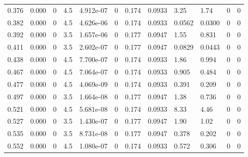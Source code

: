 \documentclass[preview]{standalone}
\begin{document}
{{\begin{tabular}{L{1.2cm}C{1.2cm} C{0.3cm}C{0.5cm} C{1.4cm}C{1.4cm} C{1.4cm}C{1.4cm} C{1.6cm}C{1.6cm} C{1.6cm}C{1.6cm}}
  0.376  &  0.000  & 0     & 4.5 &  4.912e-07  & 0  &  0.174&   0.0933& 3.25 & 1.74   &  0 & 0  \\ 
  0.382  &  0.000  & 0     & 4.5 &  4.626e-06  & 0  &  0.174&   0.0933& 0.0562 & 0.0300   &  0 & 0  \\ 
  0.392  &  0.000  & 0     & 3.5 &  1.657e-06  & 0  &  0.177&   0.0947& 1.55 & 0.831   &  0 & 0  \\ 
  0.411  &  0.000  & 0     & 3.5 &  2.602e-07  & 0  &  0.177&   0.0947& 0.0829 & 0.0443   &  0 & 0  \\ 
  0.438  &  0.000  & 0     & 4.5 &  7.700e-07  & 0  &  0.174&   0.0933& 1.86 & 0.994   &  0 & 0  \\ 
  0.467  &  0.000  & 0     & 4.5 &  7.064e-07  & 0  &  0.174&   0.0933& 0.905 & 0.484   &  0 & 0  \\ 
  0.477  &  0.000  & 0     & 4.5 &  4.069e-09  & 0  &  0.174&   0.0933& 0.391 & 0.209   &  0 & 0  \\ 
  0.497  &  0.000  & 0     & 3.5 &  1.664e-08  & 0  &  0.177&   0.0947& 1.38 & 0.736   &  0 & 0  \\ 
  0.521  &  0.000  & 0     & 4.5 &  5.681e-08  & 0  &  0.174&   0.0933& 8.33 & 4.46   &  0 & 0  \\ 
  0.527  &  0.000  & 0     & 3.5 &  1.430e-07  & 0  &  0.177&   0.0947& 1.90 & 1.02   &  0 & 0  \\ 
  0.535  &  0.000  & 0     & 3.5 &  8.731e-08  & 0  &  0.177&   0.0947& 0.378 & 0.202   &  0 & 0  \\ 
  0.552  &  0.000  & 0     & 4.5 &  1.080e-07  & 0  &  0.174&   0.0933& 0.572 & 0.306   &  0 & 0  \\ 
\hline 
\end{tabular} 

}}
\end{document}
